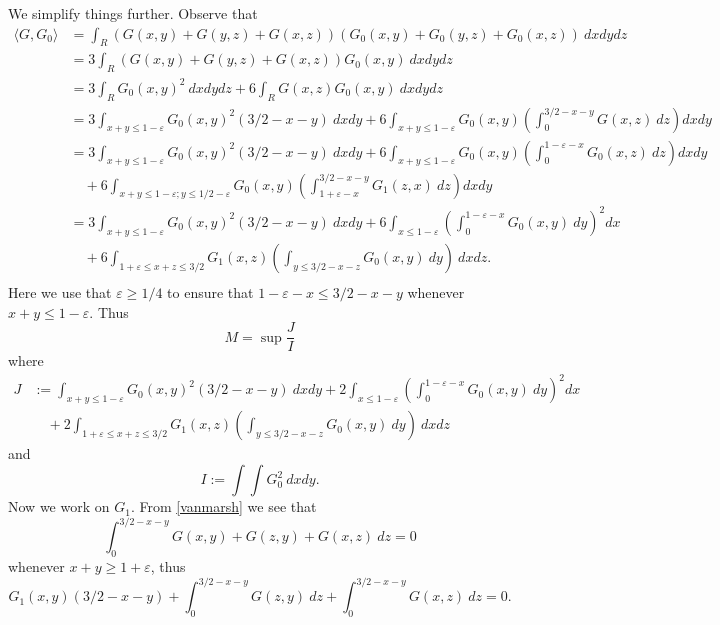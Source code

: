 \documentclass[12pt,a4paper,reqno]{amsart}
\numberwithin{equation}{section}
\theoremstyle{plain}
\theoremstyle{definition}
\newcommand\eps{\varepsilon}
\begin{document}
We simplify things further.  Observe that
\begin{align*}
\langle G, G_0 \rangle &= \int_R (G(x,y)+G(y,z)+G(x,z)) (G_0(x,y)+G_0(y,z)+G_0(x,z))\ dx dy dz \\
&= 3 \int_R (G(x,y)+G(y,z)+G(x,z)) G_0(x,y)\ dx dy dz \\
&= 3 \int_R G_0(x,y)^2\ dx dy dz + 6 \int_R G(x,z) G_0(x,y)\ dx dy dz \\
&= 3 \int_{x+y \leq 1-\eps} G_0(x,y)^2 (3/2-x-y)\ dx dy + 6 \int_{x+y \leq 1-\eps} G_0(x,y) (\int_0^{3/2-x-y} G(x,z)\ dz) dx dy \\
&= 3 \int_{x+y \leq 1-\eps} G_0(x,y)^2 (3/2-x-y)\ dx dy + 6 \int_{x+y \leq 1-\eps} G_0(x,y) (\int_0^{1-\eps-x} G_0(x,z)\ dz) dx dy \\
&\quad + 6 \int_{x+y \leq 1-\eps; y \leq 1/2-\eps} G_0(x,y) (\int_{1+\eps-x}^{3/2-x-y} G_1(z,x)\ dz) dx dy\\
&= 3 \int_{x+y \leq 1-\eps} G_0(x,y)^2 (3/2-x-y)\ dx dy + 6 \int_{x \leq 1-\eps} (\int_0^{1-\eps-x} G_0(x,y)\ dy)^2 dx  \\
&\quad + 6 \int_{1+\eps \leq x+z \leq 3/2} G_1(x,z) (\int_{y \leq 3/2-x-z} G_0(x,y)\ dy)\ dx dz.\\
\end{align*}
Here we use that $\eps \geq 1/4$ to ensure that $1-\eps-x \leq 3/2-x-y$ whenever $x+y \leq 1-\eps$.  Thus 
$$ M = \sup \frac{ J }{ I }$$
where
\begin{align*}
J &:= \int_{x+y \leq 1-\eps} G_0(x,y)^2 (3/2-x-y)\ dx dy + 2 \int_{x \leq 1-\eps} (\int_0^{1-\eps-x} G_0(x,y)\ dy)^2 dx \\
&\quad + 2 \int_{1+\eps \leq x+z \leq 3/2} G_1(x,z) (\int_{y \leq 3/2-x-z} G_0(x,y)\ dy)\ dx dz
\end{align*}
and
$$ I := \int\int G_0^2\ dx dy.$$
Now we work on $G_1$.  From \eqref{vanmarsh} we see that
$$ \int_0^{3/2-x-y} G(x,y) + G(z,y) + G(x,z)\ dz = 0 $$
whenever $x+y \geq 1+\eps$, thus
\begin{equation}\label{hamog}
 G_1(x,y) (3/2-x-y) + \int_0^{3/2-x-y} G(z,y)\ dz + \int_0^{3/2-x-y} G(x,z)\ dz = 0.
\end{equation}
\end{document}
